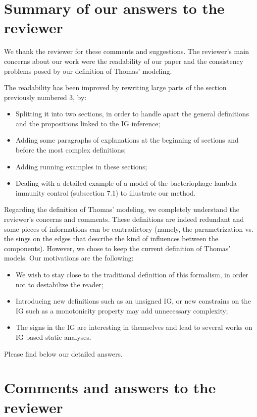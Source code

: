 \documentclass[11pt]{article}
\begin{document}
\section*{Summary of our answers to the reviewer}

We thank the reviewer for these comments and  suggestions.
The reviewer's main concerns about our work were the readability of our paper and the consistency problems posed by our definition of Thomas' modeling.

The readability has been improved by rewriting large parts of the section previously numbered 3, by:
\begin{itemize}
  \item Splitting it into two sections, in order to handle apart the general definitions and the propositions linked to the IG inference;
  \item Adding some paragraphs of explanations at the beginning of sections and before the most complex definitions;
  \item Adding running examples in these sections;
  \item Dealing with a detailed example of a model of the bacteriophage lambda immunity control (subsection 7.1) to illustrate our method.
\end{itemize}

Regarding the definition of Thomas' modeling, we completely understand the reviewer's concerns and comments. These definitions are indeed redundant and some pieces of informations can be contradictory (namely, the parametrization vs. the sings on the edges that describe the kind of influences between the components).
However, we chose to keep the current definition of Thomas' models. Our motivations are the following:
\begin{itemize}
  \item We wish to stay close to the traditional definition of this formalism, in order not to destabilize the reader;
  \item Introducing new definitions such as an unsigned IG, or new constrains on the IG such as a monotonicity property may add unnecessary complexity;
  \item The signs in the IG are interesting in themselves and lead to several works on IG-based static analyses.
\end{itemize}

Please find below our detailed answers.



\section*{Comments and answers to the reviewer}
\end{document}

